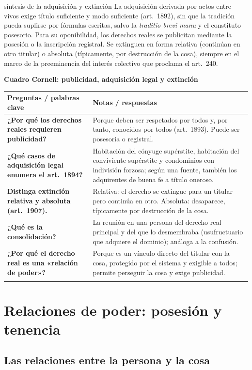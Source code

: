 \documentclass[12pt,oneside]{book}
\renewcommand{\arraystretch}{1.25}
\newcommand{\cq}[2]{\textbf{#1} & #2 \\[0.45em]}
\newcommand{\cornell}[3]{%
\par\bigskip\noindent\textbf{\large Cuadro Cornell: #1}\par\smallskip
\begin{center}
\small
\renewcommand{\arraystretch}{1.15}
\begin{tabularx}{\textwidth}{>{\raggedright\arraybackslash}p{0.27\textwidth}>{\raggedright\arraybackslash}X}
\toprule
\textbf{Preguntas / palabras clave} & \textbf{Notas / respuestas} \\
\midrule
#2
\midrule
\multicolumn{2}{p{\dimexpr\textwidth-2\tabcolsep\relax}}{\textbf{Resumen.} #3} \\
\bottomrule
\end{tabularx}
\end{center}
}
\begin{document}
\begin{conceptoclave}{síntesis de la adquisición y extinción}
La adquisición derivada por actos entre vivos exige título suficiente y modo suficiente (art.~1892), sin que la tradición pueda suplirse por fórmulas escritas, salvo la \textit{traditio brevi manu} y el constituto posesorio. Para su oponibilidad, los derechos reales se publicitan mediante la posesión o la inscripción registral. Se extinguen en forma relativa (continúan en otro titular) o absoluta (típicamente, por destrucción de la cosa), siempre en el marco de la preeminencia del interés colectivo que proclama el art.~240.
\end{conceptoclave}

\cornell{publicidad, adquisición legal y extinción}{
\cq{¿Por qué los derechos reales requieren publicidad?}{Porque deben ser respetados por todos y, por tanto, conocidos por todos (art.~1893). Puede ser posesoria o registral.}
\cq{¿Qué casos de adquisición legal enumera el art.~1894?}{Habitación del cónyuge supérstite, habitación del conviviente supérstite y condominios con indivisión forzosa; según una fuente, también los adquirentes de buena fe a título oneroso.}
\cq{Distinga extinción relativa y absoluta (art.~1907).}{Relativa: el derecho se extingue para un titular pero continúa en otro. Absoluta: desaparece, típicamente por destrucción de la cosa.}
\cq{¿Qué es la consolidación?}{La reunión en una persona del derecho real principal y del que lo desmembraba (usufructuario que adquiere el dominio); análoga a la confusión.}
\cq{¿Por qué el derecho real es una «relación de poder»?}{Porque es un vínculo directo del titular con la cosa, protegido por el sistema y exigible a todos; permite perseguir la cosa y exige publicidad.}
}{La publicidad (posesoria o registral) hace conocido y oponible el derecho real. La ley adquiere por sí ciertos derechos (habitación del cónyuge y del conviviente, condominios con indivisión forzosa). La extinción puede ser relativa, absoluta o por consolidación. El derecho real es una relación de poder protegida por el sistema jurídico.}

\part{Relaciones de poder: posesión y tenencia}

\chapter[Las relaciones entre la persona y la cosa]{Las relaciones entre la persona y la cosa}\label{cap:poder}
\end{document}
